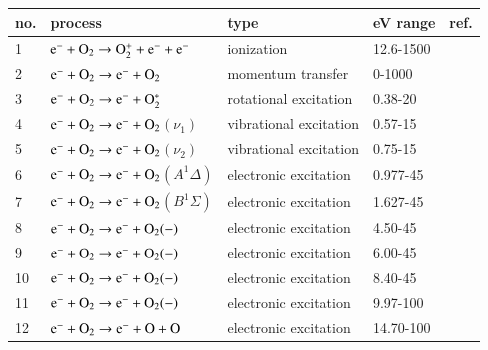 \begin{table}[!htbp]
  \center{}
  \begin{threeparttable}
    \label{tab:tableO2}
    \begin{tabular*}{\textwidth}{l@{\extracolsep{\fill}}llll}
    \toprule
    {no.}  & {process} & {type} &  {eV range}  &  {ref.} \\
    \midrule
      1 & $\rm e^- + O_2 \rightarrow O_2^+ + e^- + e^-$  &  ionization   &  12.6-1500 &   \cite{lxc:2024:morgan} \\ 
      \midrule     
      2 & $\rm e^- + O_2 \rightarrow e^- + O_2$  &  momentum transfer   &  0-1000  & \cite{lxc:2024:morgan}\\   
      \midrule
      3 & $\rm e^- + O_2 \rightarrow e^- + O_2^* $  &  rotational excitation   &  0.38-20 & \cite{lxc:2024:morgan}\\ 
           \midrule
      4 & $\rm e^- + O_2 \rightarrow e^- + O_2$$(\nu_1) $  &  vibrational excitation   &  0.57-15 &\cite{lxc:2024:morgan}\\  
      5 & $\rm e^- + O_2 \rightarrow e^- + O_2$$(\nu_2) $  &  vibrational excitation   &  0.75-15 &\cite{lxc:2024:morgan}\\ 
          \midrule
      6 & $\rm e^- + O_2 \rightarrow e^- + O_2$$(A^1 \Delta) $  &  electronic excitation   &  0.977-45 & \cite{lxc:2024:morgan}\\ 
      7 & $\rm e^- + O_2 \rightarrow e^- + O_2$$(B^1 \Sigma) $  &  electronic excitation   &  1.627-45 & \cite{lxc:2024:morgan}\\ 
      8 & $\rm e^- + O_2 \rightarrow e^- + O_2(-) $  &  electronic excitation   &  4.50-45 & \cite{lxc:2024:morgan}\\ 
      9 & $\rm e^- + O_2 \rightarrow e^- + O_2(-) $  &  electronic excitation   &  6.00-45 & \cite{lxc:2024:morgan}\\ 
      10 & $\rm e^- + O_2 \rightarrow e^- + O_2(-) $  &  electronic excitation   &  8.40-45 & \cite{lxc:2024:morgan}\\ 
      11 & $\rm e^- + O_2 \rightarrow e^- + O_2(-) $  &  electronic excitation   &  9.97-100 & \cite{lxc:2024:morgan}\\ 
      12 & $\rm e^- + O_2 \rightarrow e^- + O + O $  &  electronic excitation   &  14.70-100 & \cite{lxc:2024:morgan}\\ 
    \bottomrule
    \end{tabular*}

   \end{threeparttable}
\end{table}
